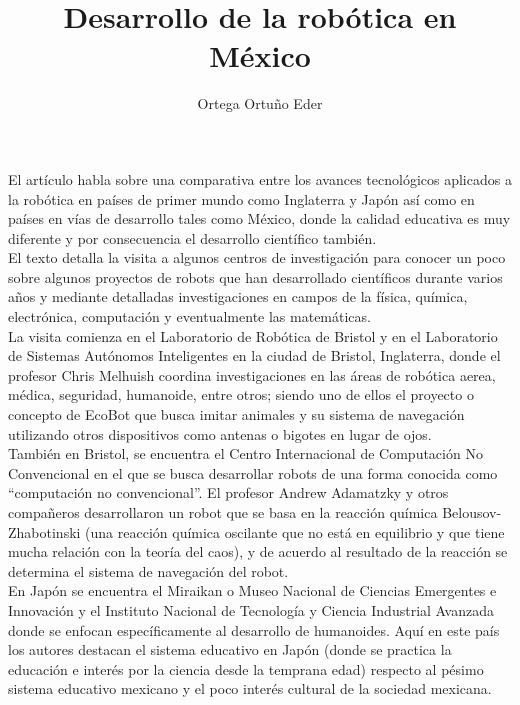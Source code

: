 \documentclass{article}
\title{Desarrollo de la rob\'otica en México}
\author{Ortega Ortu\~no Eder}
\date{} %
\begin{document}
	\maketitle
	\normalsize{
El art\'iculo habla sobre una comparativa entre los avances tecnol\'ogicos aplicados a la rob\'otica en países de primer mundo como Inglaterra y Jap\'on así como en pa\'ises en v\'ias de desarrollo tales como M\'exico, donde la calidad educativa es muy diferente y por consecuencia el desarrollo cient\'ifico tambi\'en.
\\

El texto detalla la visita a algunos centros de investigación para conocer un poco sobre algunos proyectos de robots que han desarrollado científicos durante varios años y mediante detalladas investigaciones en campos de la física, química, electrónica, computación y eventualmente las matemáticas.
\\

La visita comienza en el Laboratorio de Robótica de Bristol y en el Laboratorio de Sistemas Autónomos Inteligentes en la ciudad de Bristol, Inglaterra, donde el profesor Chris Melhuish coordina investigaciones en las áreas de robótica aerea, médica, seguridad, humanoide, entre otros; siendo uno de ellos el proyecto o concepto de EcoBot que busca imitar animales y su sistema de navegación utilizando otros dispositivos como antenas o bigotes en lugar de ojos.
\\

También en Bristol, se encuentra el Centro Internacional de Computación No Convencional en el que se busca desarrollar robots de una forma conocida como “computación no convencional”. El profesor Andrew Adamatzky y otros compañeros desarrollaron un robot que se basa en la reacción química Belousov-Zhabotinski (una reacción química oscilante que no está en equilibrio y que tiene mucha relación con la teoría del caos), y de acuerdo al resultado de la reacción se determina el sistema de navegación del robot.
\\

En Japón se encuentra el Miraikan o Museo Nacional de Ciencias Emergentes e Innovación y el Instituto Nacional de Tecnología y Ciencia Industrial Avanzada donde se enfocan específicamente al desarrollo de humanoides. Aquí en este país los autores destacan el sistema educativo en Japón (donde se practica la educación e interés por la ciencia desde la temprana edad) respecto al pésimo sistema educativo mexicano y el poco interés cultural de la sociedad mexicana.
\\

}
\end{document}
